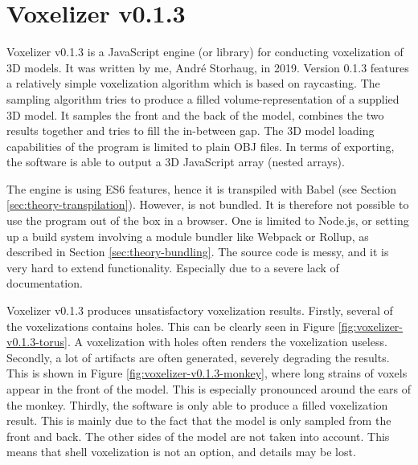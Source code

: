\section{Voxelizer v0.1.3}
\label{sec:voxelizer-v013}
Voxelizer v0.1.3 \cite{voxelizer-v0.1.3} is a JavaScript engine (or library) for conducting voxelization of 3D models. It was written by me, André Storhaug, in 2019. Version 0.1.3 features a relatively simple voxelization algorithm which is based on raycasting. The sampling algorithm tries to produce a filled volume-representation of a supplied 3D model. It samples the front and the back of the model, combines the two results together and tries to fill the in-between gap. The 3D model loading capabilities of the program is limited to plain OBJ files. In terms of exporting, the software is able to output a 3D JavaScript array (nested arrays).

The engine is using ES6 features, hence it is transpiled with Babel (see Section \ref{sec:theory-transpilation}). However, is not bundled. It is therefore not possible to use the program out of the box in a browser. One is limited to Node.js, or setting up a build system involving a module bundler like Webpack or Rollup, as described in Section \ref{sec:theory-bundling}. The source code is messy, and it is very hard to extend functionality. Especially due to a severe lack of documentation.

Voxelizer v0.1.3 produces unsatisfactory voxelization results. Firstly, several of the voxelizations contains holes. This can be clearly seen in Figure \ref{fig:voxelizer-v0.1.3-torus}. A voxelization with holes often renders the voxelization useless. Secondly, a lot of artifacts are often generated, severely degrading the results. This is shown in Figure \ref{fig:voxelizer-v0.1.3-monkey}, where long strains of voxels appear in the front of the model. This is especially pronounced around the ears of the monkey. Thirdly, the software is only able to produce a filled voxelization result. This is mainly due to the fact that the model is only sampled from the front and back. The other sides of the model are not taken into account. This means that shell voxelization is not an option, and details may be lost.

